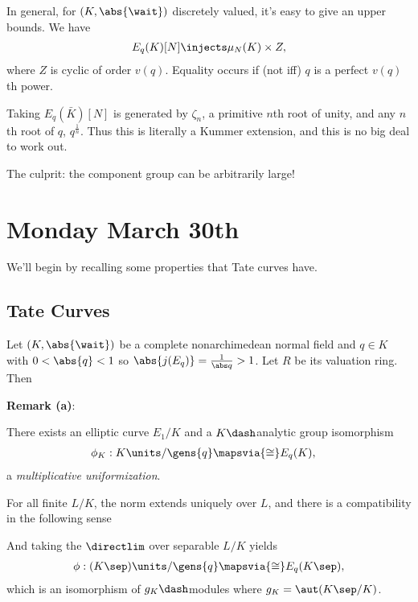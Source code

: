 In general, for \((K, \abs{\wait})\) discretely valued, it's easy to
give an upper bounds. We have
\begin{align*}
E_q(K)[N] \injects \mu_N(K) \times Z
,\end{align*} where \(Z\) is cyclic of order \(v(q)\). Equality occurs
if (not iff) \(q\) is a perfect \(v(q)\)th power.

Taking \(E_q(\bar K)[N]\) is generated by \(\zeta_n\), a primitive
\(n\)th root of unity, and any \(n\)th root of \(q\), \(q^{\frac 1 n}\).
Thus this is literally a Kummer extension, and this is no big deal to
work out.

The culprit: the component group can be arbitrarily large!

\hypertarget{monday-march-30th}{%
\section{Monday March 30th}\label{monday-march-30th}}

We'll begin by recalling some properties that Tate curves have.

\hypertarget{tate-curves}{%
\subsection{Tate Curves}\label{tate-curves}}

Let \((K, \abs{\wait})\) be a complete nonarchimedean normal field and
\(q\in K\) with \(0 < \abs{q} < 1\) so
\(\abs{j(E_q)} = {1 \over \abs q} > 1\). Let \(R\) be its valuation
ring. Then

\textbf{Remark (a)}:

There exists an elliptic curve \(E_1/K\) and a \(K\dash\)analytic group
isomorphism \begin{align*}
\phi_K: K\units/\gens{q} &\mapsvia{\cong} E_q(K)
,\end{align*} a \emph{multiplicative uniformization}.

For all finite \(L/K\), the norm extends uniquely over \(L\), and there
is a compatibility in the following sense

\begin{center}\end{center}

And taking the \(\directlim\) over separable \(L/K\) yields
\begin{align*}
\phi: (K\sep)\units/\gens{q} \mapsvia{\cong} E_q(K\sep)
,\end{align*} which is an isomorphism of \(g_K\dash\)modules where
\(g_K = \aut(K\sep/K)\).

